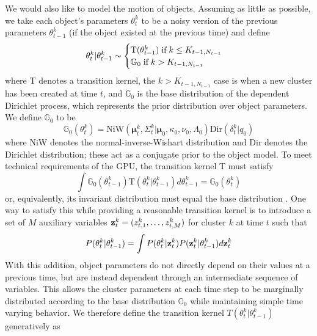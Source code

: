 \documentclass{article}
\begin{document}
We would also like to model the motion of objects. Assuming as little as possible, we take each object's parameters $\theta_t^k$ to be a noisy version of the previous parameters $\theta_{t-1}^k$ (if the object existed at the previous time) and define
\begin{equation}
    \theta_t^k | \theta_{t-1}^k \sim
    \begin{cases}
        \text{T}(\theta_{t-1}^k) \hspace{1mm} \text{if} \hspace{1mm} k \leq K_{t-1,N_{t-1}} \\
        \mathbb{G}_0 \hspace{1mm} \text{if} \hspace{1mm} k > K_{t-1,N_{t-1}}
    \end{cases}
\end{equation}
where T denotes a transition kernel, the $k > K_{t-1,N_{t-1}}$ case is when a new cluster has been created at time $t$, and $\mathbb{G}_0$ is the base distribution of the dependent Dirichlet process, which represents the prior distribution over object parameters. We define $\mathbb{G}_0$ to be
\begin{equation}
    \label{basedistro}
    \mathbb{G}_{0}(\theta_t^k) 
        = \text{NiW}(\boldsymbol{\mu}_t^k, \Sigma_t^k | \boldsymbol{\mu}_0, \kappa_0, \nu_0, \Lambda_0) 
        \text{Dir}( \delta_t^k | q_0)
\end{equation}
where NiW denotes the normal-inverse-Wishart distribution and Dir denotes the Dirichlet distribution; these act as a conjugate prior to the object model. To meet technical requirements of the GPU, the transition kernel T must satisfy
\begin{equation}
    \int \mathbb{G}_{0}(\theta_{t-1}^k)\text{T}(\theta_{t}^k|\theta_{t-1}^k) d\theta_{t-1}^k = \mathbb{G}_{0}(\theta_{t}^k)
\end{equation}
or, equivalently, its invariant distribution must equal the base distribution \cite{gasthaus_thesis}. One way to satisfy this while providing a reasonable transition kernel is to introduce a set of $M$ auxiliary variables $\bold{z}_t^k = (z_{t,1}^k, \ldots, z_{t,M}^k)$ for cluster $k$ at time $t$ such that
\begin{eqnarray}
\label{auxiliaryvariablecriteria}
P(\theta_t^k | \theta_{t-1}^k) = \int P(\theta_t^k | \bold{z}_t^k) P(\bold{z}_t^k | \theta_{t-1}^k) d\bold{z}_t^k
\end{eqnarray}
With this addition, object parameters do not directly depend on their values at a previous time, but are instead dependent through an intermediate sequence of variables. This allows the cluster parameters at each time step to be marginally distributed according to the base distribution $\mathbb{G}_{0}$ while maintaining simple time varying behavior. We therefore define the transition kernel $T(\theta_t^k | \theta_{t-1}^k)$ generatively as
\end{document}
